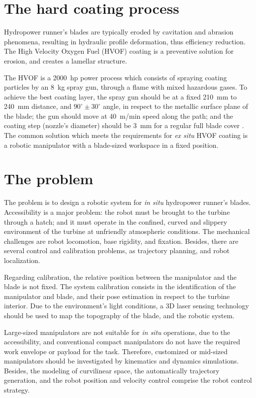 \section{The hard coating process}\label{hvof}

Hydropower runner's blades are typically eroded by cavitation and abrasion
phenomena, resulting in hydraulic profile deformation, thus efficiency
reduction. The High Velocity Oxygen Fuel (HVOF) coating is a preventive
solution for erosion, and creates a lamellar structure. 

The HVOF is a 2000~hp power process which consists of
spraying coating particles by an 8~kg spray gun, through a flame with mixed
hazardous gases. To achieve the best coating layer, the spray gun should be at
a fixed 210~mm to 240~mm distance, and $90^\circ \pm 30^\circ$ angle, in respect
to the metallic surface plane of the blade; the gun should move at 40~m/min
speed along the path; and the coating step (nozzle's diameter) should be 3~mm
for a regular full blade cover \cite{li2002effect}. The
common solution which meets the requirements for \textit{ex situ} HVOF coating
is a robotic manipulator with a blade-sized workspace in a fixed position.

\section{The problem}\label{problem}

The problem is to design a robotic system for \textit{in situ}
hydropower runner's blades. Accessibility is a major problem: the robot must be
brought to the turbine through a hatch; and it must operate in the confined,
curved and slippery environment of the turbine at unfriendly atmospheric
conditions. The mechanical challenges are robot locomotion, base rigidity, and
fixation. Besides, there are several control and calibration problems, as
trajectory planning, and robot localization.

Regarding calibration, the relative position between the manipulator and the
blade is not fixed. The system calibration consists in the identification of
the manipulator and blade, and their pose estimation in respect to the turbine
interior. Due to the environment's light conditions, a 3D laser sensing
technology should be used to map the topography of the blade, and the robotic
system. 

Large-sized manipulators are not suitable for \textit{in situ} operations, due
to the accessibility, and conventional compact manipulators do not
have the required work envelope or payload for the task. Therefore,
customized or mid-sized manipulators should be investigated by kinematics and
dynamics simulations. Besides, the modeling of curvilinear space,
the automatically trajectory generation, and the robot position and velocity
control comprise the robot control strategy.


